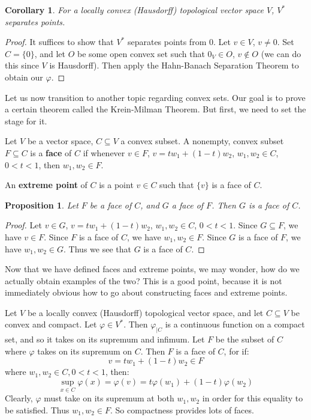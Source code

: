 \documentclass[a4paper,12pt]{report}
\newcommand{\sse} {\subseteq}
\newcommand{\vphi} {\varphi}
\newtheorem{corollary}[theorem]{Corollary}
\newtheorem{prop}[theorem]{Proposition}
\newenvironment{definition}[1][Definition.]{\begin{trivlist}
\item[\hskip \labelsep {\bfseries #1}]}{\end{trivlist}}
\begin{document}
	\begin{corollary}
	For a locally convex (Hausdorff) topological vector space $V$, $V^*$ separates points.
	\end{corollary}
	\begin{proof}
	It suffices to show that $V^*$ separates points from $0$. Let $v \in V$, $v \neq 0$. Set $C = \{0\}$, and let $O$ be some open convex set such that $0_V \in O$, $v \notin O$ (we can do this since $V$ is Hausdorff). Then apply the Hahn-Banach Separation Theorem to obtain our $\vphi$.
	\end{proof}
		
	\noindent Let us now transition to another topic regarding convex sets. Our goal is to prove a certain theorem called the Krein-Milman Theorem. But first, we need to set the stage for it.
	
	\begin{definition}
	Let $V$ be a vector space, $C \sse V$ a convex subset. A nonempty, convex subset $F \sse C$ is a \textbf{face} of $C$ if whenever $v \in F$, $v = tw_1 + (1 - t)w_2$, $w_1, w_2 \in C$, $0 < t < 1$, then $w_1, w_2 \in F$. 
	
	An \textbf{extreme point} of $C$ is a point $v \in C$ such that $\{v\}$ is a face of $C$.
	\end{definition}

	\begin{prop}
	Let $F$ be a face of $C$, and $G$ a face of $F$. Then $G$ is a face of $C$. 
	\end{prop}
	\begin{proof}
	Let $v \in G$, $v = tw_1 + (1 - t)w_2$, $w_1, w_2 \in C$, $0 < t < 1$. Since $G \sse F$, we have $v \in F$. Since $F$ is a face of $C$, we have $w_1, w_2 \in F$. Since $G$ is a face of $F$, we have $w_1, w_2 \in G$. Thus we see that $G$ is a face of $C$.
	\end{proof}
	
	\noindent Now that we have defined faces and extreme points, we may wonder, how do we actually obtain examples of the two? This is a good point, because it is not immediately obvious how to go about constructing faces and extreme points.
	
	Let $V$ be a locally convex (Hausdorff) topological vector space, and let $C \sse V$ be convex and compact. Let $\vphi \in V^*$. Then $\vphi_{|C}$ is a continuous function on a compact set, and so it takes on its supremum and infimum. Let $F$ be the subset of $C$ where $\vphi$ takes on its supremum on $C$. Then $F$ is a face of $C$, for if:
	\[ v = tw_1 + (1 - t)w_2 \in F \]
	where $w_1, w_2 \in C, 0 < t < 1$, then:
	\[ \sup_{x \in C} \vphi(x) = \vphi(v) = t\vphi(w_1) + (1 - t)\vphi(w_2) \]
	Clearly, $\vphi$ must take on its supremum at both $w_1, w_2$ in order for this equality to be satisfied. Thus $w_1, w_2 \in F$. So compactness provides lots of faces.
	
\end{document}
